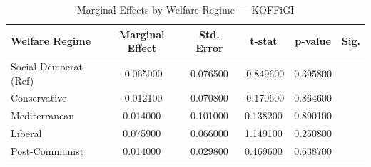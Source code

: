 \begin{table}[htbp]
\caption{Marginal Effects by Welfare Regime — KOFFiGI}
\label{tab:marginal_effects_KOFFiGI}
\begin{tabular}{lccccc}
\toprule
Welfare Regime & Marginal Effect & Std. Error & t-stat & p-value & Sig. \\
\midrule
Social Democrat (Ref) & -0.065000 & 0.076500 & -0.849600 & 0.395800 &  \\
Conservative & -0.012100 & 0.070800 & -0.170600 & 0.864600 &  \\
Mediterranean & 0.014000 & 0.101000 & 0.138200 & 0.890100 &  \\
Liberal & 0.075900 & 0.066000 & 1.149100 & 0.250800 &  \\
Post-Communist & 0.014000 & 0.029800 & 0.469600 & 0.638700 &  \\
\bottomrule
\end{tabular}
\end{table}
